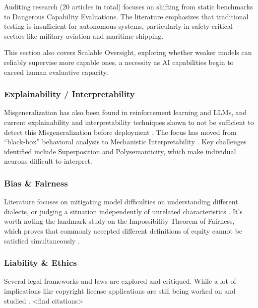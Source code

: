 			Auditing research (20 articles in total) focuses on shifting from static benchmarks to Dangerous Capability Evaluations. The literature emphasizes that traditional testing is insufficient for autonomous systems, particularly in safety-critical sectors like military aviation and maritime shipping. \begin{reviewed} This section also covers Scalable Oversight, exploring whether weaker models can reliably supervise more capable ones, a necessity as AI capabilities begin to exceed human evaluative capacity.

		\subsubsection{Explainability / Interpretability}

			Misgeneralization has also been found in reinforcement learning and LLMs, and current explainability and interpretability techniques shown to not be sufficient to detect this Misgeneralization before deployment \cite{langosco2022goal}. The focus has moved from ``black-box'' behavioral analysis to Mechanistic Interpretability \cite{anthropic2025biology}. Key challenges identified include Superposition and Polysemanticity, which make individual neurons difficult to interpret.

		\subsubsection{Bias \& Fairness}

			Literature focuses on mitigating model difficulties on understanding different dialects, or judging a situation independently of unrelated characteristics \cite{li_instance-consistent_2025}. It's worth noting the landmark study on the Impossibility Theorem of Fairness, which proves that commonly accepted different definitions of equity cannot be satisfied simultaneously \cite{kleinberg2016inherent}.

\end{reviewed}

		\subsubsection{Liability \& Ethics}

			Several legal frameworks and laws are explored and critiqued. While a lot of implications like copyright license applications are still being worked on and studied \cite{janczuk_risks_2024}. <find citations>

